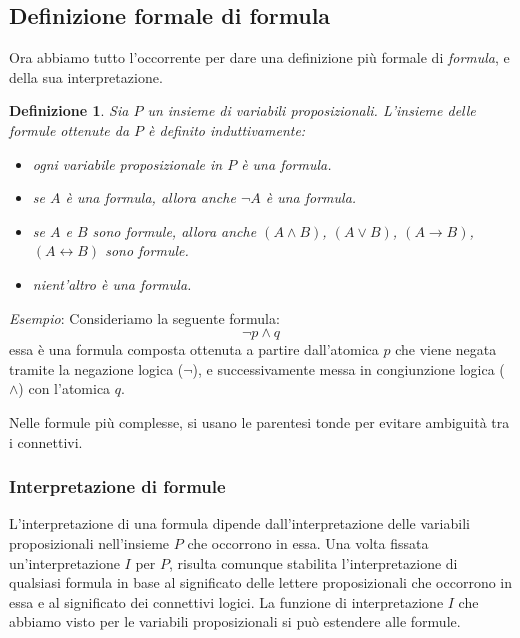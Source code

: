 \documentclass[a4paper,12pt]{report}
\newcommand{\tto} {\leftrightarrow}
\newtheorem{definition}{Definizione}[section]
\begin{document}
\subsection*{Definizione formale di formula}
Ora abbiamo tutto l'occorrente per dare una definizione più formale di \emph{formula}, e della sua interpretazione.
\begin{definition}
    Sia $P$ un insieme di variabili proposizionali. L'insieme delle formule ottenute da $P$ è definito induttivamente:
    \begin{itemize}
        \item ogni variabile proposizionale in $P$ è una formula.
        \item se $A$ è una formula, allora anche $\lnot A$ è una formula.
        \item se $A$ e $B$ sono formule, allora anche $(A \land B)$, $(A \lor B)$, $(A \to B)$, $(A \tto B)$ sono formule.
        \item nient'altro è una formula.
    \end{itemize}
\end{definition}
\emph{Esempio}: Consideriamo la seguente formula: 
\[ \lnot p \land q \] 
essa è una formula composta ottenuta a partire dall'atomica $p$ che viene negata tramite la negazione logica ($\lnot$), e successivamente messa in congiunzione logica ($\land$) con l'atomica $q$.

Nelle formule più complesse, si usano le parentesi tonde per evitare ambiguità tra i connettivi.

\subsubsection*{Interpretazione di formule}
L'interpretazione di una formula dipende dall'interpretazione delle variabili proposizionali nell'insieme $P$ che occorrono in essa. Una volta fissata un'interpretazione $I$ per $P$, risulta comunque stabilita l'interpretazione di qualsiasi formula in base al significato delle lettere proposizionali che occorrono in essa e al significato dei connettivi logici. La funzione di interpretazione $I$ che abbiamo visto per le variabili proposizionali si può estendere alle formule.
\end{document}
